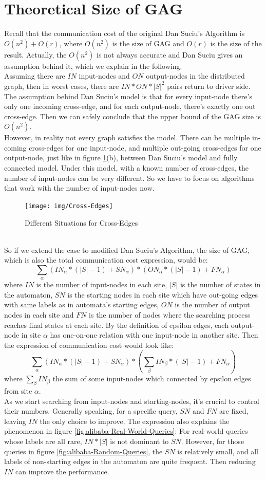 \section{Theoretical Size of GAG}
Recall that the communication cost of the original Dan Suciu's Algorithm is $O(n^2)+O(r)$, where $O(n^2)$ is the size of GAG and $O(r)$ is the size of the result. Actually, the $O(n^2)$ is not always accurate and Dan Suciu gives an  assumption behind it, which we explain in the following.
\\Assuming there are $IN$ input-nodes and $ON$ output-nodes in the distributed graph, then in worst cases, there are $IN*ON*|S|^2$ pairs return to driver side. The assumption behind Dan Suciu's model is that for every input-node there's only one incoming cross-edge, and for each output-node, there's exactly one out cross-edge. Then we can safely conclude that the upper bound of the GAG size is $O(n^2)$.
\\However, in reality not every graph satisfies the model. There can be multiple in-coming cross-edges for one input-node, and multiple out-going cross-edges for one output-node, just like in figure \ref{fig:Cross-Edges}(b), between Dan Suciu's model and fully connected model. Under this model, with a known number of cross-edges, the number of input-nodes can be very different. So we have to focus on algorithms that work with the number of input-nodes now.
\begin{figure}[h!]
  \caption{Different Situations for Cross-Edges}
  \label{fig:Cross-Edges}
  \centering
    \texttt{[image: img/Cross-Edges]}
\end{figure}
\\So if we extend the case to modified Dan Suciu's Algorithm, the size of GAG, which is also the total communication cost expression, would be:
$$\sum_{\alpha}{(IN_{\alpha}*(|S|-1)+SN_{\alpha})*(ON_{\alpha}*(|S|-1)+FN_{\alpha})}$$
where $IN$ is the number of input-nodes in each site, $|S|$ is the number of states in the automaton, $SN$ is the starting nodes in each site which have out-going edges with same labels as in automata's starting edges, $ON$ is the number of output nodes in each site and $FN$ is the number of nodes where the searching process reaches final states at each site. By the definition of epsilon edges, each output-node in site $\alpha$ has one-on-one relation with one input-node in another site. Then the expression of communication cost would look like:
$$\sum_{\alpha}{(IN_{\alpha}*(|S|-1)+SN_{\alpha})*(\sum_{\beta}{IN_{\beta}}*(|S|-1)+FN_{\alpha})}$$
where $\sum_{\beta}{IN_{\beta}}$ the sum of some input-nodes which connected by epsilon edges from site  $\alpha$.
\\As we start searching from input-nodes and starting-nodes, it's crucial to control their numbers. Generally speaking, for a specific query, $SN$ and $FN$ are fixed, leaving $IN$ the only choice to improve. The expression also explains the phenomenon in figure \ref{fig:alibaba-Real-World-Queries}: For real-world queries whose labels are all rare, $IN*|S|$ is not dominant to $SN$. However, for those queries in figure \ref{fig:alibaba-Random-Queries}, the $SN$ is relatively small, and all labels of non-starting edges in the automaton are quite frequent. Then reducing  $IN$ can improve the performance.
